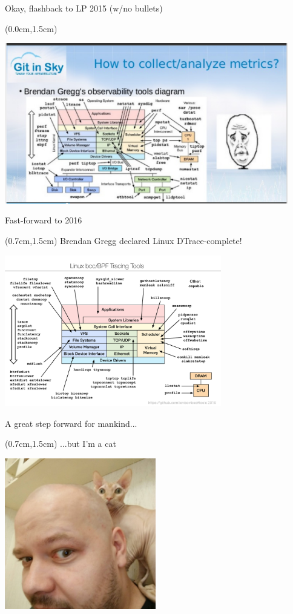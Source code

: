\documentclass[xetex,14pt,aspectratio=169]{beamer}
\begin{document}
\begin{frame}{Okay, flashback to LP 2015 (w/no bullets)}
\begin{textblock*}{\framewidth-0.8cm}(0.0cm,1.5cm) %
\begin{minipage}{\textwidth}
  \centering
  \includegraphics[height=7cm]{img/2015.png}
\end{minipage}
\end{textblock*}
\end{frame}

\begin{frame}{Fast-forward to 2016}
\begin{textblock*}{\framewidth-0.8cm}(0.7cm,1.5cm) %
Brendan Gregg declared Linux DTrace-complete!
\begin{minipage}{\textwidth}
  \centering
  \includegraphics[height=6.6cm]{img/2016.png}
\end{minipage}
\end{textblock*}
\end{frame}

\begin{frame}{A great step forward for mankind...}
\begin{textblock*}{\framewidth-0.8cm}(0.7cm,1.5cm) %
...but I'm a cat
\begin{minipage}{\textwidth}
  \centering
  \includegraphics[height=6.6cm]{img/cat}
\end{minipage}
\end{textblock*}
\end{frame}
\end{document}
